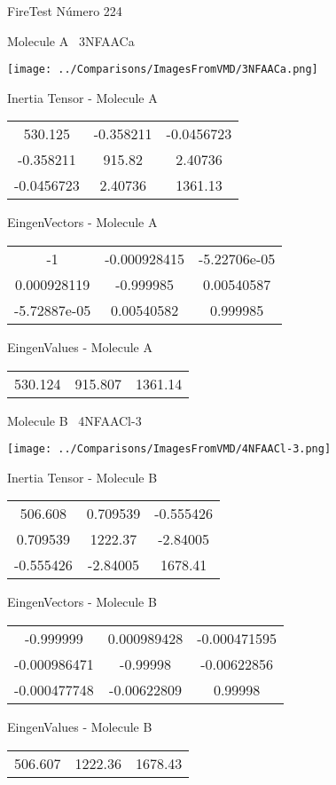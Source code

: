 \vtab[-3cm]
\begin{center}
{\large FireTest \tab Número 224}
\end{center}
\begin{multicols}{2}
\begin{center}

Molecule A \
3NFAACa

\texttt{[image: ../Comparisons/ImagesFromVMD/3NFAACa.png]}

Inertia Tensor - Molecule A \\
\begin{tabular}{|c c c|}
530.125	 & 	-0.358211	 & 	-0.0456723	 \\
-0.358211	 & 	915.82	 & 	2.40736	 \\
-0.0456723	 & 	2.40736	 & 	1361.13
\end{tabular}

\vtab
 EingenVectors - Molecule A     \\
\begin{tabular}{|c c c|}
-1	 & 	-0.000928415	 & 	-5.22706e-05	 \\
0.000928119	 & 	-0.999985	 & 	0.00540587	 \\
-5.72887e-05	 & 	0.00540582	 & 	0.999985
\end{tabular}

\vtab
 EingenValues - Molecule A     \\
\begin{tabular}{|c c c|}
530.124	 & 	915.807	 & 	1361.14	 \\
\end{tabular}
\columnbreak

Molecule B \
4NFAACl-3

\texttt{[image: ../Comparisons/ImagesFromVMD/4NFAACl-3.png]}

Inertia Tensor - Molecule B \\
\begin{tabular}{|c c c|}
506.608	 & 	0.709539	 & 	-0.555426	 \\
0.709539	 & 	1222.37	 & 	-2.84005	 \\
-0.555426	 & 	-2.84005	 & 	1678.41
\end{tabular}

\vtab
 EingenVectors - Molecule B     \\
\begin{tabular}{|c c c|}
-0.999999	 & 	0.000989428	 & 	-0.000471595	 \\
-0.000986471	 & 	-0.99998	 & 	-0.00622856	 \\
-0.000477748	 & 	-0.00622809	 & 	0.99998
\end{tabular}

\vtab
 EingenValues - Molecule B     \\
\begin{tabular}{|c c c|}
506.607	 & 	1222.36	 & 	1678.43	 \\
\end{tabular}

\end{center}
\end{multicols}

